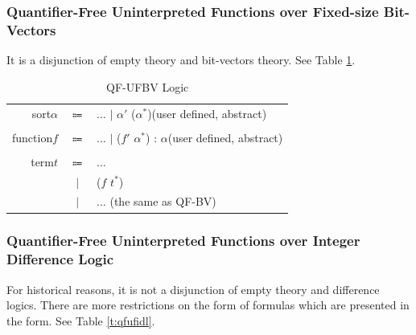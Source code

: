 \documentclass[10pt,letter]{article}
\theoremstyle{definition}
\begin{document}
\subsubsection{Quantifier-Free Uninterpreted Functions over Fixed-size Bit-Vectors}
It is a disjunction of empty theory and bit-vectors theory. See Table \ref{t:qfufbv}.

\begin{table}[!h]
\begin{mdframed}
\centering
\begin{tabular}{r c l}
sort\qquad $\alpha$ & $\Coloneqq$ & $\ldots$ $\mid$ $\alpha'$ ($\alpha^*$)\rm\qquad(user defined, abstract)\\
\\
function\qquad $f$ & $\Coloneqq$ & $\ldots$ $\mid$ \rm ($f'$ $\alpha^*$) : $\alpha$\qquad(user defined, abstract)\\
\\
term\qquad $t$ & $\Coloneqq$ & $\ldots$ \\
& $\mid$ & ($f$ $t^*$)\\
& $\mid$ & $\ldots$ \qquad(\rm the same as QF-BV)\\
\end{tabular}
\end{mdframed}
\caption{QF-UFBV Logic}
\label{t:qfufbv}
\end{table}

\subsubsection{Quantifier-Free Uninterpreted Functions over Integer Difference Logic}
For historical reasons, it is not a disjunction of empty theory and difference logics. There are more restrictions on the form of formulas which are presented in the form. See Table \ref{t:qfufidl}.
\end{document}
